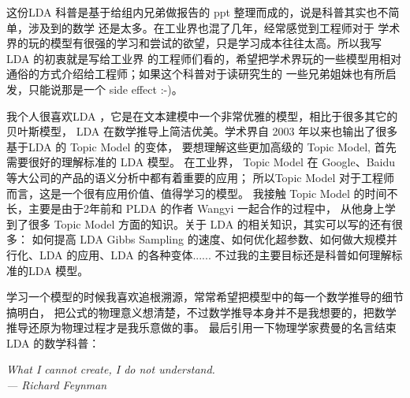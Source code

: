 这份LDA 科普是基于给组内兄弟做报告的 ppt 整理而成的，说是科普其实也不简单，涉及到的数学
还是太多。在工业界也混了几年，经常感觉到工程师对于
学术界的玩的模型有很强的学习和尝试的欲望，只是学习成本往往太高。所以我写 LDA 的初衷就是写给工业界
的工程师们看的，希望把学术界玩的一些模型用相对通俗的方式介绍给工程师；如果这个科普对于读研究生的
一些兄弟姐妹也有所启发，只能说那是一个 side effect :-)。

我个人很喜欢LDA ，它是在文本建模中一个非常优雅的模型，相比于很多其它的贝叶斯模型，
LDA 在数学推导上简洁优美。学术界自 2003 年以来也输出了很多基于LDA 的 Topic Model 的变体，
要想理解这些更加高级的 Topic Model, 首先需要很好的理解标准的 LDA 模型。
在工业界， Topic Model 在 Google、Baidu
等大公司的产品的语义分析中都有着重要的应用；
所以Topic Model 对于工程师而言，这是一个很有应用价值、值得学习的模型。
我接触 Topic Model 的时间不长，主要是由于2年前和 PLDA 的作者 Wangyi 一起合作的过程中，
从他身上学到了很多 Topic Model 方面的知识。关于 LDA 的相关知识，其实可以写的还有很多：
如何提高 LDA Gibbs Sampling 的速度、如何优化超参数、如何做大规模并行化、LDA 的应用、LDA 的各种变体......
不过我的主要目标还是科普如何理解标准的LDA 模型。

学习一个模型的时候我喜欢追根溯源，常常希望把模型中的每一个数学推导的细节搞明白，
把公式的物理意义想清楚，不过数学推导本身并不是我想要的，把数学推导还原为物理过程才是我乐意做的事。
最后引用一下物理学家费曼的名言结束 LDA 的数学科普：

\begin{center}
\emph{What I cannot create, I do not understand. \\
--- Richard Feynman
}
\end{center}
